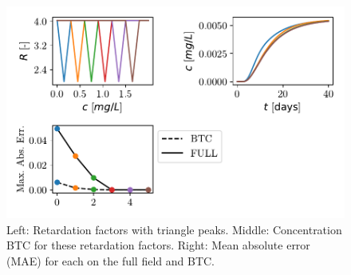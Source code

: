 \begin{figure}[h]
    \centering
    \includegraphics{figs/triangle_ret_pertubation.pdf}
    \caption{Left: Retardation factors with triangle peaks. Middle: Concentration BTC for these retardation factors. Right: Mean absolute error (MAE) for each on the full field and BTC.}
    \label{fig:triangle_ret_pertubation}
\end{figure}




